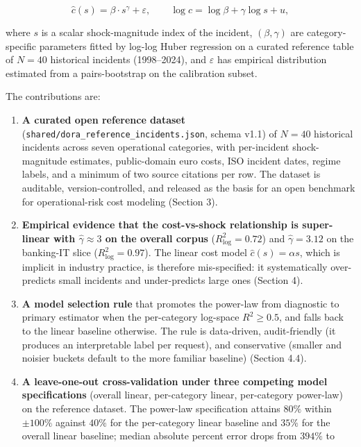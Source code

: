 \documentclass[
]{article}
\begin{document}
\[
\hat{c}(s) = \beta \cdot s^\gamma + \varepsilon, \qquad \log \hat{c} = \log \beta + \gamma \log s + u,
\]

where \(s\) is a scalar shock-magnitude index of the incident,
\((\beta, \gamma)\) are category-specific parameters fitted by log-log
Huber regression on a curated reference table of \(N=40\) historical
incidents (1998--2024), and \(\varepsilon\) has empirical distribution
estimated from a pairs-bootstrap on the calibration subset.

The contributions are:

\begin{enumerate}
\def\labelenumi{\arabic{enumi}.}
\item
  \textbf{A curated open reference dataset}
  (\texttt{shared/dora\_reference\_incidents.json}, schema v1.1) of
  \(N=40\) historical incidents across seven operational categories,
  with per-incident shock-magnitude estimates, public-domain euro costs,
  ISO incident dates, regime labels, and a minimum of two source
  citations per row. The dataset is auditable, version-controlled, and
  released as the basis for an open benchmark for operational-risk cost
  modeling (Section 3).
\item
  \textbf{Empirical evidence that the cost-vs-shock relationship is
  super-linear with \(\hat{\gamma} \approx 3\) on the overall corpus}
  (\(R^2_{\log} = 0.72\)) and \(\hat{\gamma} = 3.12\) on the banking-IT
  slice (\(R^2_{\log} = 0.97\)). The linear cost model
  \(\hat{c}(s) = \alpha s\), which is implicit in industry practice, is
  therefore mis-specified: it systematically over-predicts small
  incidents and under-predicts large ones (Section 4).
\item
  \textbf{A model selection rule} that promotes the power-law from
  diagnostic to primary estimator when the per-category log-space
  \(R^2 \geq 0.5\), and falls back to the linear baseline otherwise. The
  rule is data-driven, audit-friendly (it produces an interpretable
  label per request), and conservative (smaller and noisier buckets
  default to the more familiar baseline) (Section 4.4).
\item
  \textbf{A leave-one-out cross-validation under three competing model
  specifications} (overall linear, per-category linear, per-category
  power-law) on the reference dataset. The power-law specification
  attains \(80\%\) within \(\pm 100\%\) against \(40\%\) for the
  per-category linear baseline and \(35\%\) for the overall linear
  baseline; median absolute percent error drops from \(394\%\) to

\end{enumerate}
\end{document}
